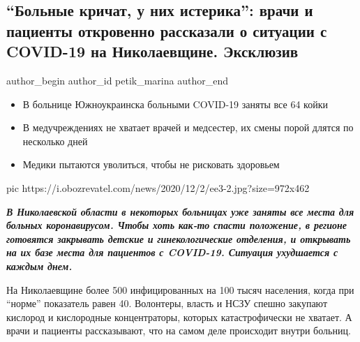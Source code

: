  
 
 
 
 
 
\subsection{\enquote{Больные кричат, у них истерика}: врачи и пациенты откровенно рассказали о ситуации с COVID-19 на Николаевщине. Эксклюзив}
\label{sec:03_12_2020.news.ua.obozrevatel.petik_marina.1.kovid_nikolaev}
\ifcmt
	author_begin
   author_id petik_marina
	author_end
\fi


\begin{itemize}
  \item В больнице Южноукраинска больными COVID-19 заняты все 64 койки
  \item В медучреждениях не хватает врачей и медсестер, их смены порой длятся по несколько дней
  \item Медики пытаются уволиться, чтобы не рисковать здоровьем
\end{itemize}

\ifcmt
pic https://i.obozrevatel.com/news/2020/12/2/ee3-2.jpg?size=972x462
\fi

\begin{leftbar}
	\bfseries\em
В Николаевской области в некоторых больницах уже заняты все места для больных
коронавирусом. Чтобы хоть как-то спасти положение, в регионе готовятся
закрывать детские и гинекологические отделения, и открывать на их базе места
для пациентов с COVID-19. Ситуация ухудшается с каждым днем.

На Николаевщине более 500 инфицированных на 100 тысяч населения, когда при
\enquote{норме} показатель равен 40. Волонтеры, власть и НСЗУ спешно закупают кислород
и кислородные концентраторы, которых катастрофически не хватает. А врачи и
пациенты рассказывают, что на самом деле происходит внутри больниц.
\end{leftbar}

